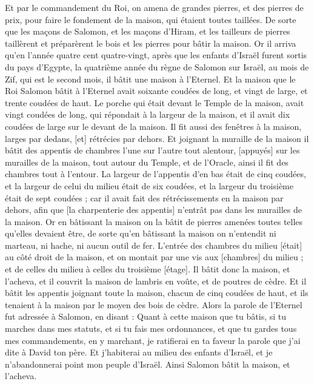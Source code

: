 \begin{multicols}{2}
Et par le commandement du Roi, on amena de grandes pierres, et des pierres de prix, pour faire le fondement de la maison, qui étaient toutes taillées.
De sorte que les maçons de Salomon, et les maçons d'Hiram, et les tailleurs de pierres taillèrent et préparèrent le bois et les pierres pour bâtir la maison.
\VerseOne{}Or il arriva qu'en l'année quatre cent quatre-vingt, après que les enfants d'Israël furent sortis du pays d'Egypte, la quatrième année du règne de Salomon sur Israël, au mois de Zif, qui est le second mois, il bâtit une maison à l'Eternel.
Et la maison que le Roi Salomon bâtit à l'Eternel avait soixante coudées de long, et vingt de large, et trente coudées de haut.
Le porche qui était devant le Temple de la maison, avait vingt coudées de long, qui répondait à la largeur de la maison, et il avait dix coudées de large sur le devant de la maison.
Il fit aussi des fenêtres à la maison, larges par dedans, [et] rétrécies par dehors.
Et joignant la muraille de la maison il bâtit des appentis de chambres l'une sur l'autre tout alentour, [appuyés] sur les murailles de la maison, tout autour du Temple, et de l'Oracle, ainsi il fit des chambres tout à l'entour.
La largeur de l'appentis d'en bas était de cinq coudées, et la largeur de celui du milieu était de six coudées, et la largeur du troisième était de sept coudées ; car il avait fait des rétrécissements en la maison par dehors, afin que [la charpenterie des appentis] n'entrât pas dans les murailles de la maison.
Or en bâtissant la maison on la bâtit de pierres amenées toutes telles qu'elles devaient être, de sorte qu'en bâtissant la maison on n'entendit ni marteau, ni hache, ni aucun outil de fer.
L'entrée des chambres du milieu [était] au côté droit de la maison, et on montait par une vis aux [chambres] du milieu ; et de celles du milieu à celles du troisième [étage].
Il bâtit donc la maison, et l'acheva, et il couvrit la maison de lambris en voûte, et de poutres de cèdre.
Et il bâtit les appentis joignant toute la maison, chacun de cinq coudées de haut, et ils tenaient à la maison par le moyen des bois de cèdre.
Alors la parole de l'Eternel fut adressée à Salomon, en disant :
Quant à cette maison que tu bâtis, si tu marches dans mes statuts, et si tu fais mes ordonnances, et que tu gardes tous mes commandements, en y marchant, je ratifierai en ta faveur la parole que j'ai dite à David ton père.
Et j'habiterai au milieu des enfants d'Israël, et je n'abandonnerai point mon peuple d'Israël.
Ainsi Salomon bâtit la maison, et l'acheva.

\end{multicols}
